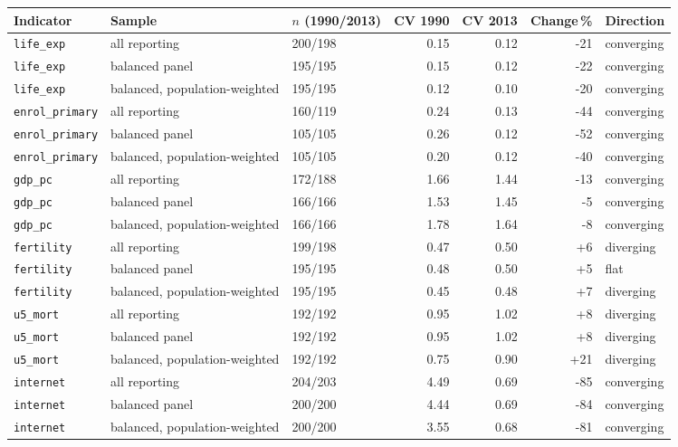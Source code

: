\footnotesize
\begin{tabular}{lllrrrl}
\toprule
Indicator & Sample & $n$ (1990/2013) & CV 1990 & CV 2013 & Change\,\% & Direction \\
\midrule
\texttt{life\_exp} & all reporting & 200/198 & 0.15 & 0.12 & -21 & converging \\
\texttt{life\_exp} & balanced panel & 195/195 & 0.15 & 0.12 & -22 & converging \\
\texttt{life\_exp} & balanced, population-weighted & 195/195 & 0.12 & 0.10 & -20 & converging \\
\texttt{enrol\_primary} & all reporting & 160/119 & 0.24 & 0.13 & -44 & converging \\
\texttt{enrol\_primary} & balanced panel & 105/105 & 0.26 & 0.12 & -52 & converging \\
\texttt{enrol\_primary} & balanced, population-weighted & 105/105 & 0.20 & 0.12 & -40 & converging \\
\texttt{gdp\_pc} & all reporting & 172/188 & 1.66 & 1.44 & -13 & converging \\
\texttt{gdp\_pc} & balanced panel & 166/166 & 1.53 & 1.45 & -5 & converging \\
\texttt{gdp\_pc} & balanced, population-weighted & 166/166 & 1.78 & 1.64 & -8 & converging \\
\texttt{fertility} & all reporting & 199/198 & 0.47 & 0.50 & +6 & diverging \\
\texttt{fertility} & balanced panel & 195/195 & 0.48 & 0.50 & +5 & flat \\
\texttt{fertility} & balanced, population-weighted & 195/195 & 0.45 & 0.48 & +7 & diverging \\
\texttt{u5\_mort} & all reporting & 192/192 & 0.95 & 1.02 & +8 & diverging \\
\texttt{u5\_mort} & balanced panel & 192/192 & 0.95 & 1.02 & +8 & diverging \\
\texttt{u5\_mort} & balanced, population-weighted & 192/192 & 0.75 & 0.90 & +21 & diverging \\
\texttt{internet} & all reporting & 204/203 & 4.49 & 0.69 & -85 & converging \\
\texttt{internet} & balanced panel & 200/200 & 4.44 & 0.69 & -84 & converging \\
\texttt{internet} & balanced, population-weighted & 200/200 & 3.55 & 0.68 & -81 & converging \\
\bottomrule
\end{tabular}
